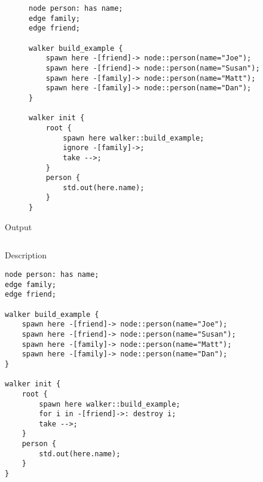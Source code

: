 \begin{description}
    \begin{lstlisting}[caption={Ignoring paths on a walk}]
node person: has name;
edge family;
edge friend;

walker build_example {
    spawn here -[friend]-> node::person(name="Joe");
    spawn here -[friend]-> node::person(name="Susan");
    spawn here -[family]-> node::person(name="Matt");
    spawn here -[family]-> node::person(name="Dan");
}

walker init {
    root {
        spawn here walker::build_example;
        ignore -[family]->;
        take -->;
    }
    person {
        std.out(here.name);
    }
}
    \end{lstlisting}
    \item[Output] \texttt{}
          \begin{lstlisting}[language=shell]
        \end{lstlisting}
    \item[Description] \texttt{}
\end{description}


\begin{description}
    \begin{lstlisting}[caption={Destroying (deleting) nodes}]
node person: has name;
edge family;
edge friend;

walker build_example {
    spawn here -[friend]-> node::person(name="Joe");
    spawn here -[friend]-> node::person(name="Susan");
    spawn here -[family]-> node::person(name="Matt");
    spawn here -[family]-> node::person(name="Dan");
}

walker init {
    root {
        spawn here walker::build_example;
        for i in -[friend]->: destroy i;
        take -->;
    }
    person {
        std.out(here.name);
    }
}
    \end{lstlisting}
    \item[Output] \texttt{}
          \begin{lstlisting}[language=shell]
        \end{lstlisting}
    \item[Description] \texttt{}
\end{description}


